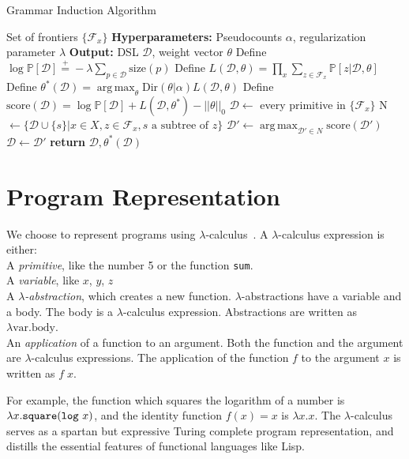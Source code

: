 \documentclass{article}
\DeclareMathOperator*{\argmax}{arg\,max} %
\newcommand{\probability}{\mathds{P}} %
\begin{document}
\begin{algorithm}[tb]
   \caption{Grammar Induction Algorithm}
   \label{grammarInductionAlgorithm}
   \begin{algorithmic}
      Set of frontiers $\{\mathcal{F}_x\}$
     \STATE \textbf{Hyperparameters:} Pseudocounts $\alpha$, regularization parameter $\lambda$
     \STATE \textbf{Output:} DSL $\mathcal{D}$, weight vector $\theta$
     \STATE Define $\log \probability[\mathcal{D}]\stackrel{+}{ = } -\lambda\sum_{p\in \mathcal{D}} \text{size}(p)$
     \STATE Define $L(\mathcal{D},\theta) =  \prod_x \sum_{z\in \mathcal{F}_x} \probability[z|\mathcal{D},\theta]$
     \STATE Define $\theta^*(\mathcal{D}) = \argmax_\theta \text{Dir}(\theta|\alpha) L(\mathcal{D},\theta)$
     \STATE Define $\text{score}(\mathcal{D}) = \log \probability[\mathcal{D}] + L(\mathcal{D},\theta^*) - ||\theta||_0$
     \STATE $\mathcal{D}\gets$ every primitive in $\{\mathcal{F}_x\}$
     \STATE N $\gets \{\mathcal{D}\cup \{s\} | x\in X, z\in \mathcal{F}_x, s\text{ a subtree of }z\}$
     \STATE $\mathcal{D}'\gets \argmax_{\mathcal{D}'\in N}\text{score}(\mathcal{D}') $
     \STATE $\mathcal{D}\gets\mathcal{D}'$
     \ELSE
     \STATE\textbf{return} $\mathcal{D},\theta^*(\mathcal{D})$
     \ENDIF
     \ENDWHILE
   \end{algorithmic}
\end{algorithm}
\section{Program Representation}
We choose to represent programs using $\lambda$-calculus~\cite{pierce}.
A $\lambda$-calculus expression is either:
\\\noindent A \emph{primitive}, like the number 5 or
  the function \texttt{sum}.
\\\noindent A \emph{variable}, like $x$, $y$, $z$
\\\noindent A $\lambda$\emph{-abstraction}, which creates a new function. $\lambda$-abstractions have a variable and a body. The body is a $\lambda$-calculus expression. Abstractions are written as $\lambda \text{var}. \text{body}$.
\\\noindent An \emph{application} of a function to an argument. Both the function and the argument are $\lambda$-calculus expressions. The application of the function $f$ to the argument $x$ is written as $f\; x$.

For example, the function which squares the logarithm of a number is
$\lambda x.\text{\texttt{square}} (\text{\texttt{log} } x)$, and the identity function $f(x) = x$ is $\lambda x.x$. The
$\lambda$-calculus serves as a spartan but expressive Turing complete
program representation, and distills the essential features of functional languages like Lisp.
\end{document}
